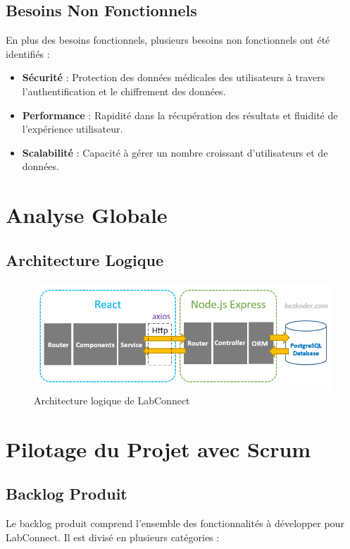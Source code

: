 \documentclass[12pt,a4paper]{report}
\begin{document}
\subsection{Besoins Non Fonctionnels}
En plus des besoins fonctionnels, plusieurs besoins non fonctionnels ont été identifiés :

\begin{itemize}
    \item \textbf{Sécurité} : Protection des données médicales des utilisateurs à travers l'authentification et le chiffrement des données.
    \item \textbf{Performance} : Rapidité dans la récupération des résultats et fluidité de l'expérience utilisateur.
    \item \textbf{Scalabilité} : Capacité à gérer un nombre croissant d'utilisateurs et de données.
\end{itemize}

\section{Analyse Globale}

\subsection{Architecture Logique}
\begin{figure}[h]
    \centering
    \includegraphics[width=\textwidth]{./img/ph/ph.png}
    \caption{Architecture logique de LabConnect}
    \label{fig:logical-architecture}
\end{figure}

\section{Pilotage du Projet avec Scrum}

\subsection{Backlog Produit}
Le backlog produit comprend l'ensemble des fonctionnalités à développer pour LabConnect. Il est divisé en plusieurs catégories :
\end{document}
